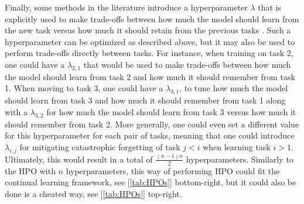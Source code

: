 \documentclass[11pt]{article}
\begin{document}
\vspace{2mm}
\noindent
Finally, some methods in the literature introduce a hyperparameter $\lambda$ that is explicitly used to make trade-offs between how much the model should learn from the new task versus how much it should retain from the previous tasks \cite{EWC_0}\cite{SI}\cite{afec}\cite{EWC_nuts_and_bolts}. Such a hyperparameter can be optimized as described above, but it may also be used to perform trade-offs directly between tasks. For instance, when training on task 2, one could have a $\lambda_{2,1}$ that would be used to make trade-offs between how much the model should learn from task 2 and how much it should remember from task 1. When moving to task 3, one could have a $\lambda_{3,1}$, to tune how much the model should learn from task 3 and how much it should remember from task 1 along with a $\lambda_{3,2}$ for how much the model should learn from task 3 versus how much it should remember from task 2. More generally, one could even set a different value for this hyperparameter for each pair of tasks, meaning that one could introduce $\lambda_{i,j}$ for mitigating catastrophic forgetting of task $j<i$ when learning task $i>1$. Ultimately, this would result in a total of $\frac{(n-1)n}{2}$ hyperparameters. Similarly to the HPO with $n$ hyperparameters, this way of performing HPO could fit the continual learning framework, see [\ref{tab:HPOs}] bottom-right, but it could also be done is a cheated way, see [\ref{tab:HPOs}] top-right.


\end{document}
